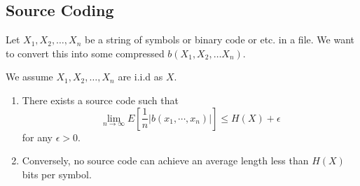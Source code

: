 \documentclass{article}
\begin{document}
\subsection{Source Coding}
	Let $X_1, X_2, \ldots, X_n$ be a string of symbols or binary code or etc. in a file. We want to convert this into some compressed $b(X_1, X_2, \ldots X_n)$.
\begin{theorem}
	We assume $X_1, X_2, \ldots, X_n$ are i.i.d as $X$.
	\begin{enumerate}
		\item There exists a source code such that 
			\[\lim_{n \to \infty} E\left[\frac{1}{n} |b(x_1, \cdots, x_n)|\right] \leq H(X) + \epsilon\] for any $\epsilon > 0.$ 

		\item Conversely, no source code can achieve an average length less than $H(X)$ bits per symbol. 
	\end{enumerate}
\end{theorem}
\end{document}

